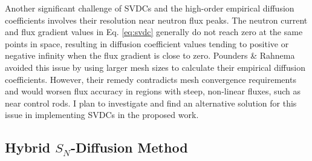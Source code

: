 Another significant challenge of \glspl{SVDC} and the high-order empirical diffusion coefficients
involves their resolution near neutron flux peaks. The neutron current and flux gradient values in
Eq. \ref{eq:svdc} generally do not reach zero at the same points in space,
resulting in diffusion coefficient values tending to positive or negative infinity when the
flux gradient is close to zero. Pounders \& Rahnema avoided this issue by using
larger mesh sizes to calculate their empirical diffusion coefficients. However, their
remedy contradicts mesh convergence requirements and would worsen flux accuracy in regions with
steep, non-linear fluxes, such as near control rods. I plan to investigate and find an alternative
solution for this issue in implementing \glspl{SVDC} in the proposed work.

\subsection{Hybrid $S_N$-Diffusion Method} \label{sec:hybrid-method}

